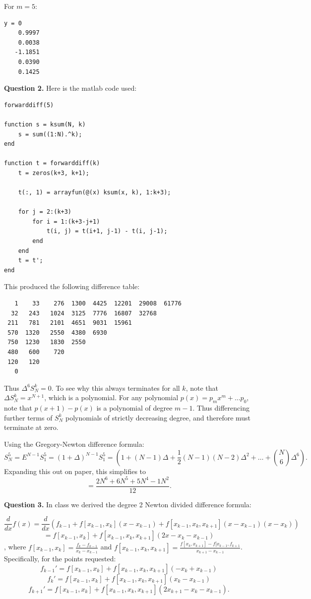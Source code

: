 \documentclass[letterpaper, reqno,11pt]{article}
\begin{document}
For $m=5$:

\begin{lstlisting}
y = 0
    0.9997
    0.0038
   -1.1851
    0.0390
    0.1425
\end{lstlisting}

{\medskip\noindent\bf Question 2.} Here is the matlab code used:
\begin{lstlisting}
forwarddiff(5)

function s = ksum(N, k)
    s = sum((1:N).^k);
end

function t = forwarddiff(k)
    t = zeros(k+3, k+1);
    
    t(:, 1) = arrayfun(@(x) ksum(x, k), 1:k+3);
    
    for j = 2:(k+3)
        for i = 1:(k+3-j+1)
            t(i, j) = t(i+1, j-1) - t(i, j-1);
        end
    end
    t = t';
end
\end{lstlisting}

This produced the following difference table:
\begin{lstlisting}
   1    33    276  1300  4425  12201  29008  61776
  32   243   1024  3125  7776  16807  32768
 211   781   2101  4651  9031  15961
 570  1320   2550  4380  6930
 750  1230   1830  2550
 480   600    720
 120   120
   0
\end{lstlisting}

Thus $\Delta^{6} S_N^{k}=0$. To see why this always terminates for all $k$, note that $\Delta S_N^{k}=x^{N+1}$, which is a polynomial. For any polynomial $p(x)=p_m x^{m}+\ldots p_0$, note that $p(x+1)-p(x)$ is a polynomial of degree $m-1$. Thus differencing further terms of $S_N^{k}$ polynomials of strictly decreasing degree, and therefore must terminate at zero.

Using the Gregory-Newton difference formula:
\[
    S_N^{5}=E^{N-1}S_1^{5}=(1+\Delta)^{N-1}S_1^{5}=\left( 1+(N-1)\Delta+\frac{1}{2}(N-1)(N-2)\Delta^2+\ldots+{N\choose 6}\Delta^{6} \right) 
.\]
Expanding this out on paper, this simplifies to
\[
=\frac{2N^6+6N^{5}+5N^{4}-1N^2}{12}
.\]

{\medskip\noindent\bf Question 3.} In class we derived the degree 2 Newton divided difference formula:

\[
    \frac{d}{dx}f(x)=\frac{d}{dx}(f_{k-1}+f[x_{k-1},x_{k}](x-x_{k-1})+f[x_{k-1},x_k,x_{k+1}](x-x_{k-1})(x-x_k))
\]
\[
    =f[x_{k-1},x_k]+f[x_{k-1},x_k,x_{k+1}]\left( 2x-x_{k}-x_{k-1} \right) 
\]
, where $f[x_{k-1},x_k]=\frac{f_k-f_{k-1}}{x_k-x_{k-1}}$ and $f[x_{k-1},x_k,x_{k+1}]=\frac{f[x_{k},x_{k+1}]-f[x_{k-1},f_{k+1}}{x_{k+1}-x_{k-1}}$. Specifically, for the points requested:
\[
f_{k-1}'=f[x_{k-1},x_k]+f[x_{k-1},x_k,x_{k+1}]\left( -x_{k}+x_{k-1} \right)
\]
\[
f_{k}'=f[x_{k-1},x_k]+f[x_{k-1},x_k,x_{k+1}]\left( x_{k}-x_{k-1} \right)
\]
\[
f_{k+1}'=f[x_{k-1},x_k]+f[x_{k-1},x_k,x_{k+1}]\left( 2x_{k+1}-x_{k}-x_{k-1} \right)
.\]
\end{document}
